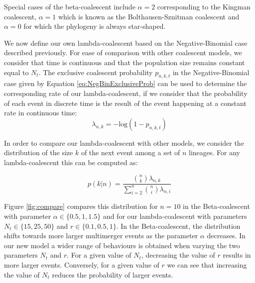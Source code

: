 \documentclass{article}
\renewcommand{\eqref}[1]{\ref{#1}}
\begin{document}
Special cases of the beta-coalescent 
include $\alpha=2$ corresponding to the Kingman coalescent,
$\alpha=1$ which is known as the Bolthausen-Sznitman coalescent
and $\alpha=0$ for which the phylogeny is always star-shaped.

We now define our own lambda-coalescent based on the Negative-Binomial case described previously.
For ease of comparison with other coalescent models, we consider that time is continuous
and that the population size remains constant equal to $N_t$. 
The exclusive coalescent probability $p_{n,k,t}$ in the Negative-Binomial case 
given by Equation \eqref{eq:NegBinExclusiveProb} can be used to determine the corresponding 
rate of our lambda-coalescent, if we consider that the probability of each event in discrete time
is the result of the event happening at a constant rate in continuous time: 
\begin{equation}
\lambda_{n,k}=-\mathrm{log}(1-p_{n,k,t})
\label{eq:ours}
\end{equation}

In order to compare our lambda-coalescent with other models, we consider 
the distribution of the size $k$ of the next event among
a set of $n$ lineages. For any lambda-coalescent this can be computed as:

\begin{equation}
p(k|n)=\frac{\binom{n}{k}\lambda_{n,k}}{\sum_{i=2}^n \binom{n}{i}\lambda_{n,i}}
\end{equation}

Figure \ref{fig:compare} compares this distribution for $n=10$ in the Beta-coalescent with 
parameter $\alpha \in \{0.5,1,1.5\}$ and for our lambda-coalescent with parameters
$N_t \in \{15,25,50\}$ and $r \in \{0.1,0.5,1\}$. In the Beta-coalescent, the distribution
shifts towards more larger multimerger events as the parameter $\alpha$ decreases.
In our new model a wider range of behaviours is obtained when varying the two parameters
$N_t$ and $r$. For a given value of $N_t$, decreasing the value of $r$ results in more
larger events. Conversely, for a given value of $r$ we can see that increasing the
value of $N_t$ reduces the probability of larger events.
\end{document}

